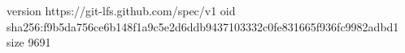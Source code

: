 version https://git-lfs.github.com/spec/v1
oid sha256:f9b5da756ce6b148f1a9c5e2d6ddb9437103332c0fe831665f936fc9982adbd1
size 9691
